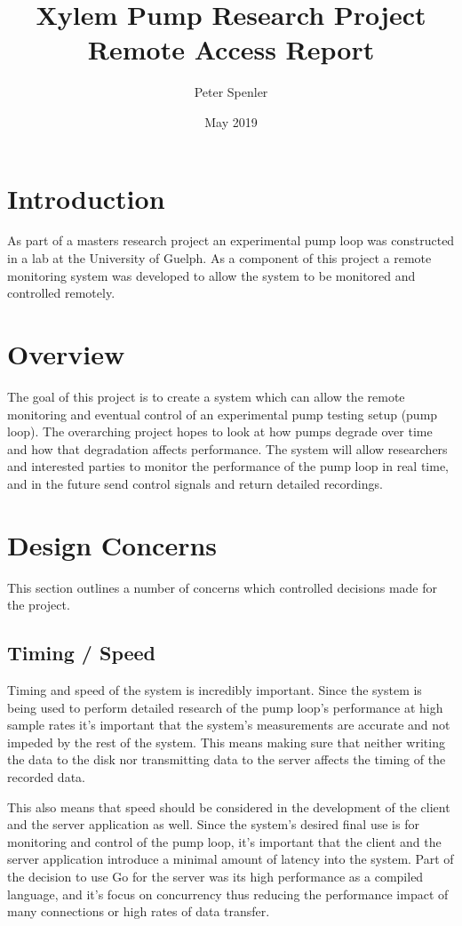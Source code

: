 \documentclass[10pt,technote]{IEEEtran}
\title{Xylem Pump Research Project Remote Access Report}
\author{Peter Spenler}
\date{May 2019}
\begin{document}
\maketitle

\section{Introduction}
As part of a masters research project an experimental pump loop was constructed in a lab at the University of Guelph. As a component of this project a remote monitoring system was developed to allow the system to be monitored and controlled remotely.

\section{Overview}
The goal of this project is to create a system which can allow the remote monitoring and eventual control of an experimental pump testing setup (pump loop). The overarching project hopes to look at how pumps degrade over time and how that degradation affects performance. The system will allow researchers and interested parties to monitor the performance of the pump loop in real time, and in the future send control signals and return detailed recordings.

\section{Design Concerns}
This section outlines a number of concerns which controlled decisions made for the project.
\subsection{Timing / Speed}
Timing and speed of the system is incredibly important. Since the system is being used to perform detailed research of the pump loop's performance at high sample rates it's important that the system's measurements are accurate and not impeded by the rest of the system. This means making sure that neither writing the data to the disk nor transmitting data to the server affects the timing of the recorded data.
\par
This also means that speed should be considered in the development of the client and the server application as well. Since the system's desired final use is for monitoring and control of the pump loop, it's important that the client and the server application introduce a minimal amount of latency into the system. Part of the decision to use Go for the server was its high performance as a compiled language, and it's focus on concurrency thus reducing the performance impact of many connections or high rates of data transfer.
\end{document}
